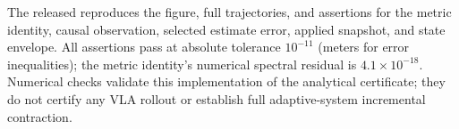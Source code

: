 The released  reproduces the
figure, full trajectories, and assertions for the metric identity, causal
observation, selected estimate error, applied snapshot, and state envelope.
All assertions pass at absolute tolerance $10^{-11}$ (meters for error
inequalities); the metric identity's numerical
spectral residual is $4.1\times10^{-18}$. Numerical checks validate this
implementation of the analytical certificate; they do not certify any VLA
rollout or establish full adaptive-system incremental contraction.
